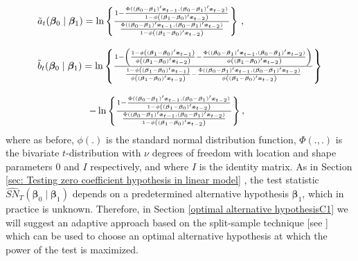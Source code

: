 \documentclass[harvard,11pt]{article}
\begin{document}
\begin{equation*}
\begin{tabular}{l}
$\tilde{a}_{t}(\bm{\beta} _{0}\mid\bm{\beta}_{1})=\ln \left\{ \frac{1-\frac{\Phi((\bm{\beta}_0-\bm{\beta}_1)'\bm{x}_{t-1},(\bm{\beta}_0-\bm{\beta}_1)'\bm{x}_{t-2} ) }{1-\phi\left(\left(\bm{\beta}_1-\bm{\beta}_0\right)'\bm{x}_{t-2}\right)}}{\frac{\Phi((\bm{\beta}_0-\bm{\beta}_1)'\bm{x}_{t-1},(\bm{\beta}_0-\bm{\beta}_1)'\bm{x}_{t-2} )}{1-\phi\left(\left(\bm{\beta}_1-\bm{\beta}_0\right)'\bm{x}_{t-2}\right)}}\right\} 
$ ,\\ 
\\ 
$\tilde{b}_{t}(\bm{\beta} _{0}\mid\bm{\beta} _{1})=\ln \left\{ \frac{1-\left( \frac{1-\phi\left(\left(\bm{\beta}_1-\bm{\beta}_0\right)'\bm{x}_{t-1}\right) }{\phi\left(\left(\bm{\beta}_1-\bm{\beta}_0\right)'\bm{x}_{t-2}\right)}-\frac{\Phi((\bm{\beta}_0-\bm{\beta}_1)'\bm{x}_{t-1},(\bm{\beta}_0-\bm{\beta}_1)'\bm{x}_{t-2} )}{\phi\left(\left(\bm{\beta}_1-\bm{\beta}_0\right)'\bm{x}_{t-2}\right) }\right) }{\frac{1-\phi\left(\left(\bm{\beta}_1-\bm{\beta}_0\right)'\bm{x}_{t-1}\right)}{\phi\left(\left(\bm{\beta}_1-\bm{\beta}_0\right)'\bm{x}_{t-2}\right)}-\frac{\Phi((\bm{\beta}_0-\bm{\beta}_1)'\bm{x}_{t-1},(\bm{\beta}_0-\bm{\beta}_1)'\bm{x}_{t-2} ) }{\phi\left(\left(\bm{\beta}_1-\bm{\beta}_0\right)'\bm{x}_{t-2}\right)}}\right\} $ \\ 
\ \ \ \ \ \ \ \ \ \ \ \ \ \ \  \\ 
\ \ \ \ \ \ \ \ \ \ \ \ \ \ \ \ $-\ln \left\{ \frac{1-\frac{\Phi((\bm{\beta}_0-\bm{\beta}_1)'\bm{x}_{t-1},(\bm{\beta}_0-\bm{\beta}_1)'\bm{x}_{t-2} ) }{1-\phi\left(\left(\bm{\beta}_1-\bm{\beta}_0\right)'\bm{x}_{t-2}\right) }}{\frac{\Phi((\bm{\beta}_0-\bm{\beta}_1)'\bm{x}_{t-1},(\bm{\beta}_0-\bm{\beta}_1)'\bm{x}_{t-2} )}{1-\phi\left(\left(\bm{\beta}_1-\bm{\beta}_0\right)'\bm{x}_{t-2}\right)}}\right\}, 
$%
\end{tabular}%
\end{equation*}%
where as before, $\phi(.)$ is the standard normal distribution function, $\Phi(.,.)$ is the bivariate $t$-distribution with $\nu$ degrees of freedom with location and shape parameters $0$ and $I$ respectively, and where $I$ is the identity matrix. As in Section \ref{sec: Testing zero coefficient hypothesis in linear model}%
, the test statistic $\widehat{SN}_{T}(\bm{\beta} _{0}\mid\bm{\beta} _{1})$ depends on a
predetermined alternative hypothesis $\bm{\beta}_{1}$, which in practice is unknown.
Therefore, in Section \ref{optimal alternative hypothesisC1} we will suggest an
adaptive approach based on the split-sample technique [see \citet{dufour2010exact}] which can be used to
choose an optimal alternative hypothesis at which the
power of the test is maximized.
\end{document}
